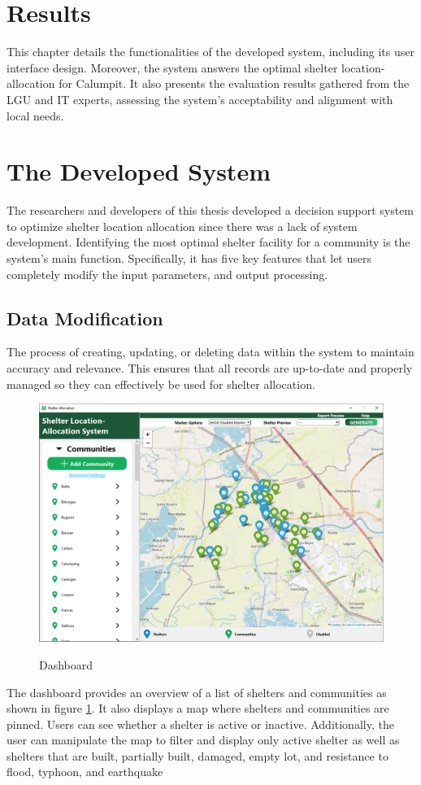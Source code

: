 \documentclass[12pt,a4paper,]{article}
\begin{document}
\section{Results}
	This chapter details the functionalities of the developed system, including its user interface design. Moreover, the system answers the optimal shelter location-allocation for Calumpit. It also presents the evaluation results gathered from the LGU and IT experts, assessing the system’s acceptability and alignment with local needs.
	
	\section{The Developed System}
	The researchers and developers of this thesis developed a decision support system to optimize shelter location allocation since there was a lack of system development. Identifying the most optimal shelter facility for a community is the system's main function. Specifically, it has five key features that let users completely modify the input parameters, and output processing. 
	
	
	\subsection{Data Modification}
	The process of creating, updating, or deleting data within the system to maintain accuracy and relevance. This ensures that all records are up-to-date and properly managed so they can effectively be used for shelter allocation.
	
	\begin{figure}[h!]
		\caption{Dashboard}
		\centering
		\includegraphics[width=\columnwidth]{Chapter 4/dashboard}
		\label{db}
	\end{figure}
	The dashboard provides an overview of a list of shelters and communities as shown in figure \ref{db}. It also displays a map where shelters and communities are pinned. Users can see whether a shelter is active or inactive. Additionally, the user can manipulate the map to filter and display only active shelter as well as shelters that are built, partially built, damaged, empty lot, and resistance to flood, typhoon, and earthquake
	
\end{document}
